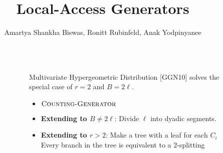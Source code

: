 \documentclass[final]{beamer}
\title{Local-Access Generators} %
\author{Amartya Shankha Biswas, Ronitt Rubinfeld, Anak Yodpinyanee} %
\institute{CSAIL, MIT} %
\newlength{\sepwid}
\newlength{\leftcolwid}
\newlength{\rightcolwid}
\newlength{\twocolwid}
\begin{document}

\setlength{\belowcaptionskip}{2ex} %
\setlength\belowdisplayshortskip{2ex} %

\begin{frame}[t] %


\begin{columns}[t] %

\begin{column}{\sepwid}\end{column} %

\begin{column}{\leftcolwid} %




\end{column} %


\begin{column}{\sepwid}\end{column} %


\begin{column}{\twocolwid} %






\end{column} %



\begin{column}{\sepwid}\end{column} %



\begin{column}{\rightcolwid} %

\begin{alertblock}{Multivariate Hypergeometric Distribution}
[GGN10] solves the special case of $r=2$ and $B = 2\ell$.
\begin{itemize}
    \item [] $\textsc{Counting-Generator}$
    \item \textbf{Extending to $B\not= 2\ell$}: Divide $\ell$ into dyadic segments.
    \item \textbf{Extending to $r>2$}: Make a tree with a leaf for each $C_i$
          Every branch in the tree is equivalent to a $2$-splitting
\end{itemize}
\end{alertblock}


\end{column}
\end{columns}
\end{frame}
\end{document}
